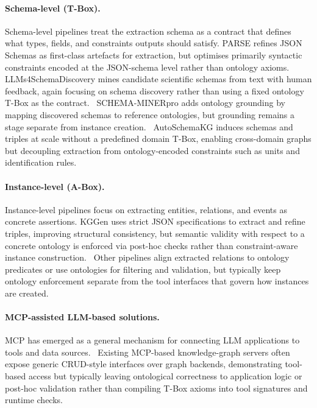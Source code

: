 \paragraph{Schema-level (T-Box).}
Schema-level pipelines treat the extraction schema as a contract that defines what types,
fields, and constraints outputs should satisfy. PARSE refines JSON Schemas as first-class
artefacts for extraction, but optimises primarily syntactic constraints encoded at the
JSON-schema level rather than ontology axioms.~\citep{shrimal2025parse}
LLMs4SchemaDiscovery mines candidate scientific schemas from text with human feedback, again
focusing on schema discovery rather than using a fixed ontology T-Box as the contract.~\citep{sadruddin2025llms4schema}
SCHEMA-MINERpro adds ontology grounding by mapping discovered schemas to reference ontologies,
but grounding remains a stage separate from instance creation.~\citep{sadruddin2025schemaminpro}
AutoSchemaKG induces schemas and triples at scale without a predefined domain T-Box, enabling
cross-domain graphs but decoupling extraction from ontology-encoded constraints such as units
and identification rules.~\citep{bai2025autoschemakg}

\paragraph{Instance-level (A-Box).}
Instance-level pipelines focus on extracting entities, relations, and events as concrete
assertions. KGGen uses strict JSON specifications to extract and refine triples, improving
structural consistency, but semantic validity with respect to a concrete ontology is enforced
via post-hoc checks rather than constraint-aware instance construction.~\citep{mo2025kggen}
Other pipelines align extracted relations to ontology predicates or use ontologies for
filtering and validation, but typically keep ontology enforcement separate from the tool
interfaces that govern how instances are created.~\citep{kommineni2024,olasunkanmi2025relate,khorshidi2025odkeplus}

\paragraph{MCP-assisted LLM-based solutions.}
MCP has emerged as a general mechanism for connecting LLM applications to tools and data
sources.~\citep{mcp_spec_2025,openai_mcp_docs_2025} Existing MCP-based
knowledge-graph servers often expose generic CRUD-style interfaces over graph backends,
demonstrating tool-based access but typically leaving ontological correctness to application
logic or post-hoc validation rather than compiling T-Box axioms into tool signatures and
runtime checks.~\citep{gannon2025mementomcp}


